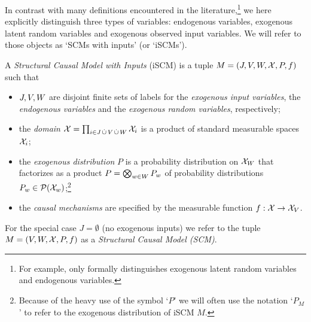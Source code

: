 In contrast with many definitions encountered in the literature,\footnote{For example, \cite{Pearl09} only formally distinguishes exogenous latent random variables and endogenous variables.} we here explicitly distinguish three types of variables: endogenous variables, exogenous latent random variables and exogenous observed input variables.
We will refer to those objects as `SCMs with inputs' (or `iSCMs').
\begin{Def}\label{def:iscm}
  A \emph{Structural Causal Model with Inputs} (iSCM) is a tuple $M = \left ( J, V, W, \mathcal{X}, P, f \right )$ such that
  \begin{itemize}
    \item $J, V, W$ are disjoint finite sets of labels for the \emph{exogenous input variables}, the \emph{endogenous variables} and the \emph{exogenous random variables}, respectively;
    \item the \emph{domain} $\mathcal{X} = \prod_{i\in J \,\dot{\cup}\, V \,\dot{\cup}\, W} \mathcal{X}_i$ is a product of standard measurable spaces $\mathcal{X}_i$;
    \item the \emph{exogenous distribution} $P$ is a probability distribution on $\mathcal{X}_{W}$ that factorizes as a product $P = \bigotimes_{w\in W} P_w$ of probability distributions $P_w \in \mathcal{P}(\mathcal{X}_w)$;\footnote{Because of the heavy use of the symbol `$P$' we will often use the notation `$P_M$' to refer to the exogenous distribution of iSCM $M$.}
    \item the \emph{causal mechanisms} are specified by the measurable function $f : \mathcal{X} \to \mathcal{X}_{V}$.
  \end{itemize}
  For the special case $J=\emptyset$ (no exogenous inputs) we refer to the tuple $M = \left ( V, W, \mathcal{X}, P, f \right )$ as a \emph{Structural Causal Model (SCM)}.
\end{Def}
